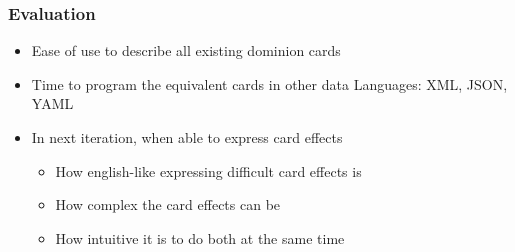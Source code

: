 
\begin{frame} \frametitle{Evaluation}
\begin{itemize}
\item Ease of use to describe all existing dominion cards
\item Time to program the equivalent cards in other data Languages: XML, JSON, YAML
\item In next iteration, when able to express card effects
  \begin{itemize}
  \item How english-like expressing difficult card effects is
  \item How complex the card effects can be
  \item How intuitive it is to do both at the same time
  \end{itemize}
\end{itemize}
\end{frame}
